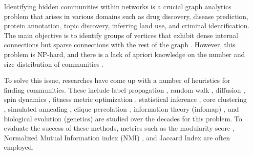 Identifying hidden communities within networks is a crucial graph analytics problem that arises in various domains such as drug discovery, disease prediction, protein annotation, topic discovery, inferring land use, and criminal identification. The main objective is to identify groups of vertices that exhibit dense internal connections but sparse connections with the rest of the graph \cite{com-gregory10}. However, this problem is NP-hard, and there is a lack of apriori knowledge on the number and size distribution of communities \cite{com-blondel08}.

To solve this issue, researches have come up with a number of heuristics for finding communities. These include label propagation \cite{com-raghavan07, com-gregory10}, random walk \cite{com-rosvall08}, diffusion \cite{com-kloster14}, spin dynamics \cite{com-reichardt06}, fitness metric optimization \cite{com-newman06, com-fortunato10}, statistical inference \cite{com-come15, com-newman16}, core clustering \cite{com-ruan15}, simulated annealing \cite{com-guimera05, com-reichardt06}, clique percolation \cite{com-derenyi05, com-gupta22}, information theory (infomap) \cite{infomap-rosvall09, com-rita20}, and  biological evolution (genetics) \cite{com-ghoshal19, com-lu20} are studied over the decades for this problem. To evaluate the success of these methods, metrics such as the modularity score \cite{com-newman06, com-blondel08}, Normalized Mutual Information index (NMI) \cite{com-jain17, com-chopade17}, and Jaccard Index \cite{com-jain17} are often employed.

